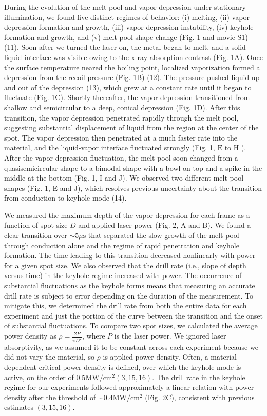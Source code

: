 \documentclass[10pt]{article}
\begin{document}
During the evolution of the melt pool and vapor depression under stationary illumination, we found five distinct regimes of behavior: (i) melting, (ii) vapor depression formation and growth, (iii) vapor depression instability, (iv) keyhole formation and growth, and (v) melt pool shape change (Fig. 1 and movie S1) (11). Soon after we turned the laser on, the metal began to melt, and a solid-liquid interface was visible owing to the $\mathrm{x}$-ray absorption contrast (Fig. 1A). Once the surface temperature neared the boiling point, localized vaporization formed a depression from the recoil pressure (Fig. 1B) (12). The pressure pushed liquid up and out of the depression (13), which grew at a constant rate until it began to fluctuate (Fig. 1C). Shortly thereafter, the vapor depression transitioned from shallow and semicircular to a deep, conical depression (Fig. 1D). After this transition, the vapor depression penetrated rapidly through the melt pool, suggesting substantial displacement of liquid from the region at the center of the spot. The vapor depression then penetrated at a much faster rate into the material, and the liquid-vapor interface fluctuated strongly (Fig. 1, $\mathrm{E}$ to $\mathrm{H}$ ). After the vapor depression fluctuation, the melt pool soon changed from a quasisemicircular shape to a bimodal shape with a bowl on top and a spike in the middle at the bottom (Fig. 1, I and J). We observed two different melt pool shapes (Fig. 1, E and J), which resolves previous uncertainty about the transition from conduction to keyhole mode (14).

We measured the maximum depth of the vapor depression for each frame as a function of spot size $D$ and applied laser power (Fig. 2, A and B). We found a clear transition over $\sim 5 \mu \mathrm{s}$ that separated the slow growth of the melt pool through conduction alone and the regime of rapid penetration and keyhole formation. The time leading to this transition decreased nonlinearly with power for a given spot size. We also observed that the drill rate (i.e., slope of depth versus time) in the keyhole regime increased with power. The occurrence of substantial fluctuations as the keyhole forms means that measuring an accurate drill rate is subject to error depending on the duration of the measurement. To mitigate this, we determined the drill rate from both the entire data for each experiment and just the portion of the curve between the transition and the onset of substantial fluctuations. To compare two spot sizes, we calculated the average power density as $\rho=\frac{2 P}{\pi D^{2}}$, where $P$ is the laser power. We ignored laser absorptivity, as we assumed it to be constant across each experiment because we did not vary the material, so $\rho$ is applied power density. Often, a material-dependent critical power density is defined, over which the keyhole mode is active, on the order of $0.5 \mathrm{MW} / \mathrm{cm}^{2}(3,15,16)$. The drill rate in the keyhole regime for our experiments followed approximately a linear relation with power density after the threshold of $\sim 0.4 \mathrm{MW} / \mathrm{cm}^{2}$ (Fig. 2C), consistent with previous estimates $(3,15,16)$.
\end{document}
